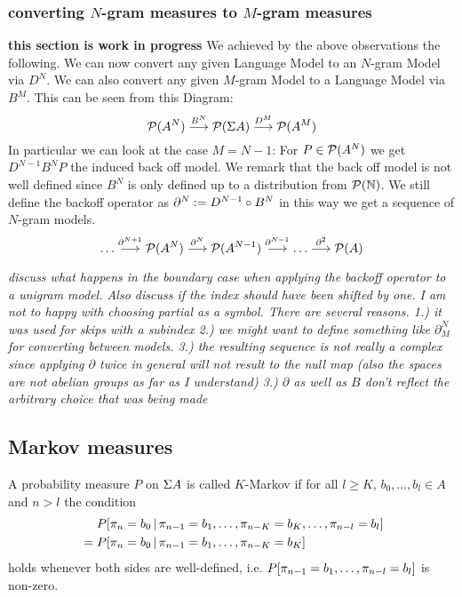 \documentclass[11pt]{article}
\begin{document}
\subsubsection{converting $N$-gram measures to $M$-gram measures}
\textbf{this section is work in progress}
We achieved by the above observations the following. 
We can now convert any given Language Model to an $N$-gram Model via $D^N$. We can also convert any given $M$-gram Model to a Language Model via $B^M$.
This can be seen from this Diagram:
\[ \mathcal{P}(A^N) \overset{B^N}{\longrightarrow} \mathcal{P}(\Sigma A) \overset{D^M}{\longrightarrow} \mathcal{P}(A^M) \]
In particular we can look at the case $M=N-1$:
For $P \in \mathcal{P}(A^N)$ we get $D^{N-1}B^NP$ the induced back off model.
We remark that the back off model is not well defined since $B^N$ is only defined up to a distribution from $\mathcal{P}({\mathbb N})$.
We still define the backoff operator as ${\partial^{N}}:=D^{N-1} \circ B^{N}$ in this way we get a sequence of $N$-gram models.
\[ \dots \overset{{\partial^{N+1}}}{\longrightarrow} \mathcal{P}(A^{N}) \overset{{\partial^{N}}}{\longrightarrow} \mathcal{P}(A^{N-1}) \overset{{\partial^{N-1}}}{\longrightarrow} \dots \overset{{\partial^{2}}}{\longrightarrow} \mathcal{P}(A)  \]

\textit{discuss what happens in the boundary case when applying the backoff operator to a unigram model. Also discuss if the index should have been shifted by one.}
\textit{I am not to happy with choosing partial as a symbol. There are several reasons. 1.) it was used for skips with a subindex 2.) we might want to define something like $\partial_M^N$ for converting between models. 3.) the resulting sequence is not really a complex since applying $\partial$ twice in general will not result to the null map (also the spaces are not abelian groups as far as I understand) 3.) $\partial$ as well as $B$ don't reflect the arbitrary choice that was being made}
\subsection{Markov measures}

A probability measure $P$ on $\Sigma A$ is called $K$-Markov if
for all $l \geq K$, $b_0,\dots,b_l \in A$ and $n > l$ the condition
\begin{align*}
  &  P[ {\pi_{n}} = b_0 \,|\, {\pi_{n-1}} = b_1, \dots, {\pi_{n-K}} = b_K, \dots, {\pi_{n-l}} = b_l ] \\  
 \;=\;&  P[ {\pi_{n}} = b_0 \,|\, {\pi_{n-1}} = b_1, \dots, {\pi_{n-K}} = b_K ]
\end{align*}
holds whenever both sides are well-defined, i.e.
$P[{\pi_{n-1}} = b_1,\dots, {\pi_{n-l}} = b_l ]$ is non-zero.
\end{document}
